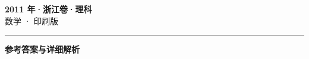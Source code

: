 \documentclass[zihao=5, a4paper]{ctexart}
\begin{document}
\begin{center}
  {\Large\bfseries 2011 年·浙江卷·理科}\\[4pt]
  {\large 数学 · 印刷版}
\end{center}
\medskip
{}

\par\bigskip\hrule\bigskip
{}
\begin{center}{\large\bfseries 参考答案与详细解析}\end{center}
\smallskip

\end{document}
